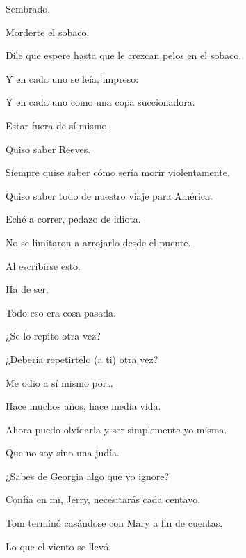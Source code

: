 \sk
Sembrado. 

\sk
Morderte el sobaco. \nb{}

\sk
Dile que espere hasta que le crezcan pelos en el sobaco. 

\sk
Y en cada uno se leía, impreso: 

\sk
Y en cada uno como una copa succionadora. 

\sk
Estar fuera de sí mismo. 

\sk
Quiso saber Reeves. 

\sk
Siempre quise saber cómo sería morir violentamente. 

\sk
Quiso saber todo de nuestro viaje para América. 

\sk
Eché a correr, pedazo de idiota.\nb{}

\sk
No se limitaron a arrojarlo desde el puente.\nb{}

\sk
Al escribirse esto. 

\sk
Ha de ser. 

\sk
Todo eso era cosa pasada. 

\sk
¿Se lo repito otra vez? 

\sk
¿Debería repetirtelo (a ti) otra vez?\nb{}

\sk
Me odio a sí mismo por\ldots{} 

\sk
Hace muchos años, hace media vida. 

\sk
Ahora puedo olvidarla y ser simplemente yo misma.\nb{}

\sk
Que no soy sino una judía. 

\sk
¿Sabes de Georgia algo que yo ignore? 

\sk
Confía en mi, Jerry, necesitarás cada centavo. 

\sk
Tom terminó casándose con Mary a fin de cuentas. 

\sk
Lo que el viento se llevó. 

